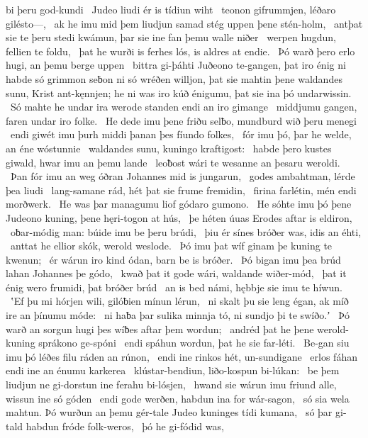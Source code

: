 bi þeru god-kundi \hld\ Judeo liudi
ér is tídiun wiht \hld\ teonon gifrummjen,
léðaro gilésto—, \hld\ ak he imu mid þem liudjun samad
stég uppen þene stén-holm, \hld\ antþat sie te þeru stedi kwámun,
þar sie ine fan þemu walle niðer \hld\ werpen hugdun,
fellien te foldu, \hld\ þat he wurði is ferhes lós,
is aldres at endie. \hld\ Þó warð þero erlo hugi,
an þemu berge uppen \hld\ bittra gi-þáhti
Juðeono te-gangen, þat iro énig ni habde só grimmon seƀon
ni só wréðen willjon, þat sie mahtin þene waldandes sunu,
Krist ant-kęnnjen; he ni was iro kúð énigumu,
þat sie ina þó undarwissin. \hld\ Só mahte he undar ira werode standen
endi an iro gimange \hld\ middjumu gangen,
faren undar iro folke. \hld\ He dede imu þene friðu selƀo,
mundburd wið þeru menegi \hld\ endi giwét imu þurh middi þanan
þes fíundo folkes, \hld\ fór imu þó, þar he welde,
an éne wóstunnie \hld\ waldandes sunu,
kuningo kraftigost: \hld\ habde þero kustes giwald,
hwar imu an þemu lande \hld\ leoƀost wári
te wesanne an þesaru weroldi. \hld\ Þan fór imu an weg óðran
Johannes mid is jungarun, \hld\ godes ambahtman,
lérde þea liudi \hld\ lang-samane rád,
hét þat sie frume fremidin, \hld\ firina farlétin,
mén endi morðwerk. \hld\ He was þar managumu liof
gódaro gumono. \hld\ He sóhte imu þó þene Judeono kuning,
þene hęri-togon at hús, \hld\ þe héten úuas
Erodes aftar is eldiron, \hld\ oƀar-módig man:
búide imu be þeru brúdi, \hld\ þiu ér sínes bróðer was,
idis an éhti, \hld\ anttat he ellior skók,
werold weslode. \hld\ Þó imu þat wíf ginam
þe kuning te kwenun; \hld\ ér wárun iro kind ódan,
barn be is bróðer. \hld\ Þó bigan imu þea brúd lahan
Johannes þe gódo, \hld\ kwað þat it gode wári,
waldande wiðer-mód, \hld\ þat it énig wero frumidi,
þat bróðer brúd \hld\ an is bed námi,
hębbje sie imu te híwun. \hld\ ʽEf þu mi hórjen wili,
gilóƀien mínun lérun, \hld\ ni skalt þu sie leng égan,
ak míð ire an þínumu móde: \hld\ ni haƀa þar sulika minnja tó,
ni sundjo þi te swíðo.ʼ \hld\ Þó warð an sorgun hugi
þes wíƀes aftar þem wordun; \hld\ andréd þat he þene werold-kuning
sprákono ge-spóni \hld\ endi spáhun wordun,
þat he sie far-léti. \hld\ Be-gan siu imu þó léðes filu
ráden an rúnon, \hld\ endi ine rinkos hét,
un-sundigane \hld\ erlos fáhan
endi ine an énumu karkerea \hld\ klústar-bendiun,
liðo-kospun bi-lúkan: \hld\ be þem liudjun ne gi-dorstun
ine ferahu bi-lósjen, \hld\ hwand sie wárun imu friund alle,
wissun ine só góden \hld\ endi gode werðen,
habdun ina for wár-sagon, \hld\ só sia wela mahtun.
Þó wurðun an þemu gér-tale Judeo kuninges
tídi kumana, \hld\ só þar gi-tald habdun
fróde folk-weros, \hld\ þó he gi-fódid was,
